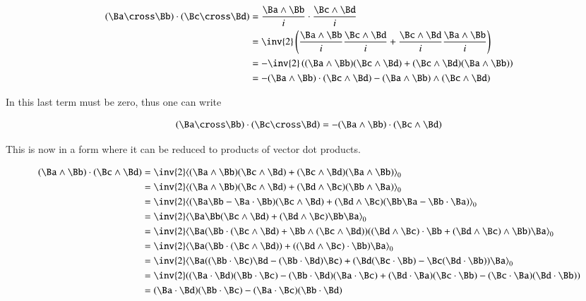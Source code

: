 \begin{align*}
( \Ba \cross \Bb ) \cdot ( \Bc \cross \Bd )
&= \frac{\Ba \wedge \Bb}{i} \cdot \frac{\Bc \wedge \Bd}{i} \\
&= \inv{2}\left( \frac{\Ba \wedge \Bb}{i} \frac{\Bc \wedge \Bd}{i} + \frac{\Bc \wedge \Bd}{i} \frac{\Ba \wedge \Bb}{i} \right) \\
&= -\inv{2}\left( (\Ba \wedge \Bb) (\Bc \wedge \Bd) + (\Bc \wedge \Bd) (\Ba \wedge \Bb) \right) \\
&= - (\Ba \wedge \Bb) \cdot (\Bc \wedge \Bd) - (\Ba \wedge \Bb) \wedge (\Bc \wedge \Bd)
\end{align*}

In  this last term must be zero, thus one can write

\begin{align}
\label{eqn:bivector:boo1}
( \Ba \cross \Bb ) \cdot ( \Bc \cross \Bd ) = -(\Ba \wedge \Bb) \cdot (\Bc \wedge \Bd)
\end{align}

This is now in a form where it can be reduced to products of vector dot products.

\begin{align*}
(\Ba \wedge \Bb) \cdot (\Bc \wedge \Bd)
&= \inv{2}\gpgradezero{ (\Ba \wedge \Bb) (\Bc \wedge \Bd) + (\Bc \wedge \Bd) (\Ba \wedge \Bb) } \\
&= \inv{2}\gpgradezero{ (\Ba \wedge \Bb) (\Bc \wedge \Bd) + (\Bd \wedge \Bc) (\Bb \wedge \Ba) } \\
&= \inv{2}\gpgradezero{ (\Ba\Bb - \Ba \cdot \Bb ) (\Bc \wedge \Bd) + (\Bd \wedge \Bc) (\Bb \Ba - \Bb \cdot \Ba ) } \\
&= \inv{2}\gpgradezero{ \Ba\Bb (\Bc \wedge \Bd) + (\Bd \wedge \Bc) \Bb \Ba } \\
&= \inv{2}\gpgradezero{ \Ba (\Bb \cdot (\Bc \wedge \Bd) + \Bb \wedge (\Bc \wedge \Bd)) ( (\Bd \wedge \Bc) \cdot \Bb + (\Bd \wedge \Bc) \wedge \Bb) \Ba } \\
&= \inv{2}\gpgradezero{ \Ba (\Bb \cdot (\Bc \wedge \Bd)) + ( (\Bd \wedge \Bc) \cdot \Bb ) \Ba } \\
&= \inv{2}\gpgradezero{ \Ba ( (\Bb \cdot \Bc) \Bd - (\Bb \cdot \Bd) \Bc ) + ( \Bd (\Bc \cdot \Bb) - \Bc (\Bd \cdot \Bb) ) \Ba } \\
&= \inv{2}( ( \Ba \cdot \Bd ) ( \Bb \cdot \Bc ) - ( \Bb \cdot \Bd ) ( \Ba \cdot \Bc ) + ( \Bd \cdot \Ba ) ( \Bc \cdot \Bb ) - ( \Bc \cdot \Ba ) ( \Bd \cdot \Bb ) ) \\
&= ( \Ba \cdot \Bd ) ( \Bb \cdot \Bc ) - ( \Ba \cdot \Bc ) ( \Bb \cdot \Bd ) \\
\end{align*}

